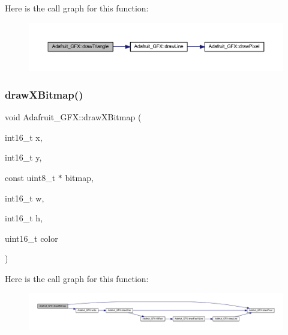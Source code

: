 Here is the call graph for this function\+:
\nopagebreak
\begin{figure}[H]
\begin{center}
\leavevmode
\includegraphics[width=350pt]{d9/d97/class_adafruit___g_f_x_a49284b9cea16ecf8c15dfd0b51a841e6_cgraph}
\end{center}
\end{figure}
\mbox{\label{class_adafruit___g_f_x_acec26bcf41c15ac6826c67e1f5e4cde6}} 
\subsubsection{\texorpdfstring{draw\+X\+Bitmap()}{drawXBitmap()}}
{\footnotesize\ttfamily void Adafruit\+\_\+\+G\+F\+X\+::draw\+X\+Bitmap (\begin{DoxyParamCaption}\item[{int16\+\_\+t}]{x,  }\item[{int16\+\_\+t}]{y,  }\item[{const uint8\+\_\+t $\ast$}]{bitmap,  }\item[{int16\+\_\+t}]{w,  }\item[{int16\+\_\+t}]{h,  }\item[{uint16\+\_\+t}]{color }\end{DoxyParamCaption})}

Here is the call graph for this function\+:
\nopagebreak
\begin{figure}[H]
\begin{center}
\leavevmode
\includegraphics[width=350pt]{d9/d97/class_adafruit___g_f_x_acec26bcf41c15ac6826c67e1f5e4cde6_cgraph}
\end{center}
\end{figure}
\mbox{\label{class_adafruit___g_f_x_a623e031e58492fb41e9fde6a05d97c12}} 
